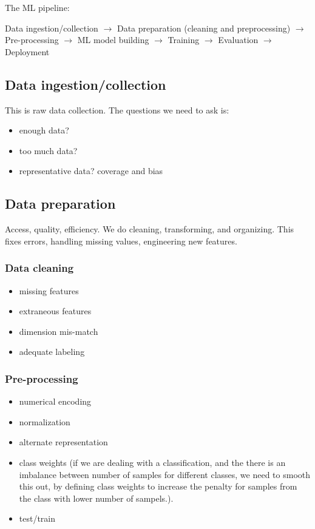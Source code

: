 \documentclass[12pt]{report}
\begin{document}
The ML pipeline:

Data ingestion/collection $\rightarrow$
Data preparation (cleaning and preprocessing) $\rightarrow$
Pre-processing $\rightarrow$
ML model building $\rightarrow$
Training $\rightarrow$
Evaluation $\rightarrow$
Deployment

\subsection{Data ingestion/collection}
This is raw data collection. The questions we need to ask is:
\begin{itemize}
  \item enough data?
  \item too much data?
  \item representative data? coverage and bias
\end{itemize}

\subsection{Data preparation}
Access, quality, efficiency. We do cleaning, transforming, and organizing. This fixes errors, handling missing values, engineering new features.

\subsubsection{Data cleaning}
\begin{itemize}
\item missing features
\item extraneous features
\item dimension mis-match
\item adequate labeling
\end{itemize}

\subsubsection{Pre-processing}
\begin{itemize}
  \item numerical encoding
  \item normalization
  \item alternate representation
  \item class weights (if we are dealing with a classification, and the there is an imbalance between number of samples for different classes, we need to smooth this out, by defining class weights to increase the penalty for samples from the class with lower number of sampels.).
  \item test/train
\end{itemize}
\end{document}
